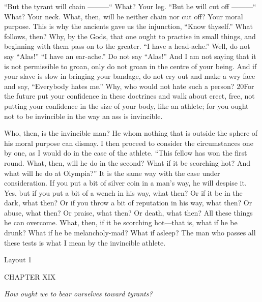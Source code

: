 ``But the tyrant will chain ———`` What? Your leg. ``But he will cut off ———`` What? Your neck. What, then, will he neither chain nor cut off? Your moral purpose. This is why the ancients gave us the injunction, ``Know thyself.'' What follows, then? Why, by the Gods, that one ought to practise in small things, and beginning with them pass on to the greater. ``I have a head-ache.'' Well, do not say ``Alas!'' ``I have an ear-ache.'' Do not say ``Alas!'' And I am not saying that it is not permissible to groan, only do not groan in the centre of your being. And if your slave is slow in bringing your bandage, do not cry out and make a wry face and say, ``Everybody hates me.'' Why, who would not hate such a person? 20For the future put your confidence in these doctrines and walk about erect, free, not putting your confidence in the size of your body, like an athlete; for you ought not to be invincible in the way an ass is invincible.

Who, then, is the invincible man? He whom nothing that is outside the sphere of his moral purpose can dismay. I then proceed to consider the circumstances one by one, as I would do in the case of the athlete. ``This fellow has won the first round. What, then, will he do in the second? What if it be scorching hot? And what will he do at Olympia?'' It is the same way with the case under consideration. If you put a bit of silver coin in a man's way, he will despise it. Yes, but if you put a bit of a wench in his way, what then? Or if it be in the dark, what then? Or if you throw a bit of reputation in his way, what then? Or abuse, what then? Or praise, what then? Or death, what then? All these things he can overcome. What, then, if it be scorching hot—that is, what if he be drunk? What if he be melancholy-mad? What if asleep? The man who passes all these tests is what I mean by the invincible athlete.



Layout 1

CHAPTER XIX

\emph{How ought we to bear ourselves toward tyrants?}

